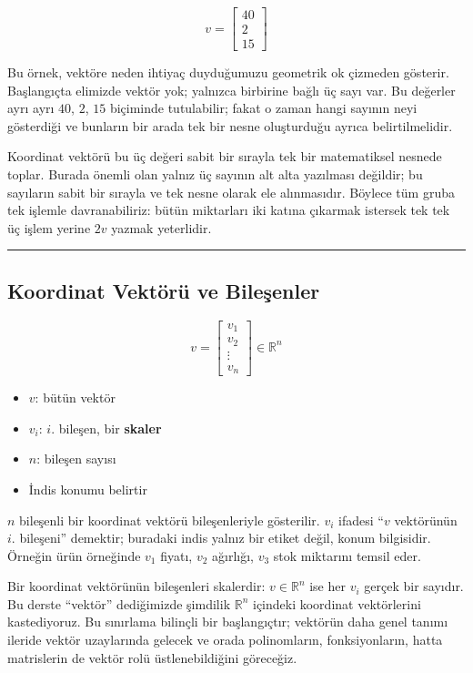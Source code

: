\documentclass[
  a4paper,
  DIV=11,
  numbers=noendperiod]{scrartcl}
\providecommand{\tightlist}{%
  \setlength{\itemsep}{0pt}\setlength{\parskip}{0pt}}
\begin{document}
\[
v=\begin{bmatrix}40\\2\\15\end{bmatrix}
\]

Bu örnek, vektöre neden ihtiyaç duyduğumuzu geometrik ok çizmeden
gösterir. Başlangıçta elimizde vektör yok; yalnızca birbirine bağlı üç
sayı var. Bu değerler ayrı ayrı \(40\), \(2\), \(15\) biçiminde
tutulabilir; fakat o zaman hangi sayının neyi gösterdiği ve bunların bir
arada tek bir nesne oluşturduğu ayrıca belirtilmelidir.

Koordinat vektörü bu üç değeri sabit bir sırayla tek bir matematiksel
nesnede toplar. Burada önemli olan yalnız üç sayının alt alta yazılması
değildir; bu sayıların sabit bir sırayla ve tek nesne olarak ele
alınmasıdır. Böylece tüm gruba tek işlemle davranabiliriz: bütün
miktarları iki katına çıkarmak istersek tek tek üç işlem yerine \(2v\)
yazmak yeterlidir.

\begin{center}\rule{0.5\linewidth}{0.5pt}\end{center}

\subsection{Koordinat Vektörü ve
Bileşenler}\label{koordinat-vektuxf6ruxfc-ve-bileux15fenler}

\[
v=\begin{bmatrix}v_1\\v_2\\\vdots\\v_n\end{bmatrix}\in\mathbb{R}^n
\]

\begin{itemize}
\tightlist
\item
  \(v\): bütün vektör
\item
  \(v_i\): \(i\). bileşen, bir \textbf{skaler}
\item
  \(n\): bileşen sayısı
\item
  İndis konumu belirtir
\end{itemize}

\(n\) bileşenli bir koordinat vektörü bileşenleriyle gösterilir. \(v_i\)
ifadesi ``\(v\) vektörünün \(i\). bileşeni'' demektir; buradaki indis
yalnız bir etiket değil, konum bilgisidir. Örneğin ürün örneğinde
\(v_1\) fiyatı, \(v_2\) ağırlığı, \(v_3\) stok miktarını temsil eder.

Bir koordinat vektörünün bileşenleri skalerdir: \(v\in\mathbb{R}^n\) ise
her \(v_i\) gerçek bir sayıdır. Bu derste ``vektör'' dediğimizde
şimdilik \(\mathbb{R}^n\) içindeki koordinat vektörlerini kastediyoruz.
Bu sınırlama bilinçli bir başlangıçtır; vektörün daha genel tanımı
ileride vektör uzaylarında gelecek ve orada polinomların,
fonksiyonların, hatta matrislerin de vektör rolü üstlenebildiğini
göreceğiz.
\end{document}
